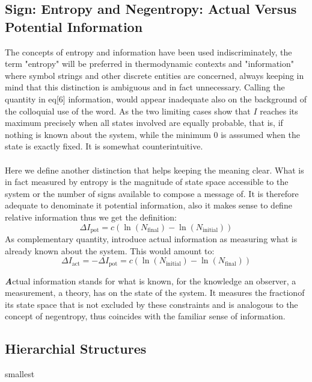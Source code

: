 \documentclass[9pt,a4paper, twocolumn]{article}
\newcounter{theo}
\newenvironment{callout}
	{\begin{calloutbox}\color{charcoal}\textbf\textit}
	{\end{calloutbox}}
\begin{document}
        \subsection{Sign: Entropy and Negentropy: Actual Versus Potential Information}
            The concepts of entropy and information have been used indiscriminately, the term "entropy" will be preferred in thermodynamic contexts and "information" where symbol strings and other discrete entities are concerned, always keeping in mind that this distinction is ambiguous and in fact unnecessary. Calling the quantity in eq[6] information, would appear inadequate also on the background of the colloquial use of the word. As the two limiting cases show that $I$ reaches its maximum precisely when all states involved are equally probable, that is, if nothing is known about the system, while the minimum $0$ is asssumed when the state is exactly fixed. It is somewhat counterintuitive.
            \\
            \\
            Here we define another distinction that helps keeping the meaning clear. What is in fact measured by entropy is the magnitude of state space accessible to the system or the number of signs available to compose a message of. It is therefore adequate to denominate it potential information, also it makes sense to define relative information thus we get the definition:
            \begin{equation}
                \Delta I_{\text{pot}} = c\left(\ln(N_{\text{final}}) - \ln(N_{\text{initial}})\right)
            \end{equation}
            As complementary quantity, introduce actual information as measuring what is already known about the system. This would amount to:
            \begin{equation}
                \Delta I_{\text{act}} = -    \Delta I_{\text{pot}} = c\left(\ln(N_{\text{initial}}) - \ln(N_{\text{final}})\right)
            \end{equation}
            \begin{callout}
                Actual information stands for what is known, for the knowledge an observer, a measurement, a theory, has on the state of the system. It measures the fractionof its state space that is not excluded by these constraints and is analogous to the concept of negentropy, thus coincides with the familiar sense of information.    
            \end{callout}
        \subsection{Hierarchial Structures}
        smallest
        
\end{document}
